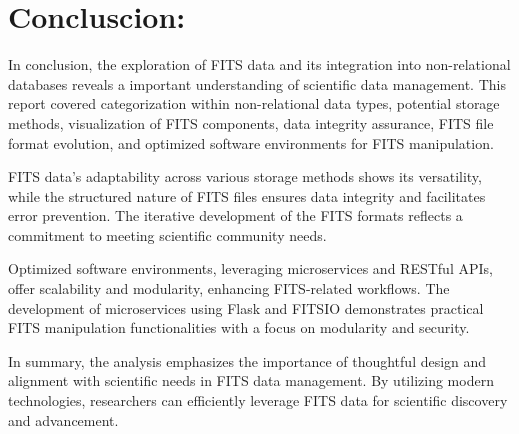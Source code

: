 \documentclass[a4paper,oneside,11pt]{book}
\begin{document}
\section{Concluscion:}
In conclusion, the exploration of FITS data and its integration into non-relational databases reveals a important understanding of scientific data management. This report covered categorization within non-relational data types, potential storage methods, visualization of FITS components, data integrity assurance, FITS file format evolution, and optimized software environments for FITS manipulation.

FITS data's adaptability across various storage methods shows its versatility, while the structured nature of FITS files ensures data integrity and facilitates error prevention. The iterative development of the FITS formats reflects a commitment to meeting scientific community needs.

Optimized software environments, leveraging microservices and RESTful APIs, offer scalability and modularity, enhancing FITS-related workflows. The development of microservices using Flask and FITSIO demonstrates practical FITS manipulation functionalities with a focus on modularity and security.

In summary, the analysis emphasizes the importance of thoughtful design and alignment with scientific needs in FITS data management. By utilizing modern technologies, researchers can efficiently leverage FITS data for scientific discovery and advancement.

\end{document}
